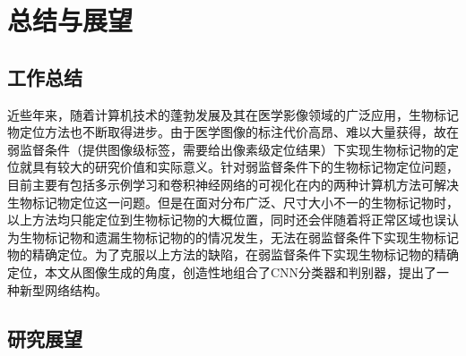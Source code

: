 \chapter{总结与展望}
\section{工作总结}
近些年来，随着计算机技术的蓬勃发展及其在医学影像领域的广泛应用，生物标记物定位方法也不断取得进步。由于医学图像的标注代价高昂、难以大量获得，故在弱监督条件（提供图像级标签，需要给出像素级定位结果）下实现生物标记物的定位就具有较大的研究价值和实际意义。针对弱监督条件下的生物标记物定位问题，目前主要有包括多示例学习和卷积神经网络的可视化在内的两种计算机方法可解决生物标记物定位这一问题。但是在面对分布广泛、尺寸大小不一的生物标记物时，以上方法均只能定位到生物标记物的大概位置，同时还会伴随着将正常区域也误认为生物标记物和遗漏生物标记物的的情况发生，无法在弱监督条件下实现生物标记物的精确定位。为了克服以上方法的缺陷，在弱监督条件下实现生物标记物的精确定位，本文从图像生成的角度，创造性地组合了CNN分类器和判别器，提出了一种新型网络结构。
\section{研究展望}
